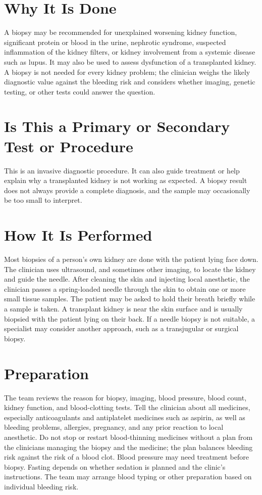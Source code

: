 \section*{Why It Is Done}
A biopsy may be recommended for unexplained worsening kidney function, significant protein or blood in the urine, nephrotic syndrome, suspected inflammation of the kidney filters, or kidney involvement from a systemic disease such as lupus. It may also be used to assess dysfunction of a transplanted kidney. A biopsy is not needed for every kidney problem; the clinician weighs the likely diagnostic value against the bleeding risk and considers whether imaging, genetic testing, or other tests could answer the question.

\section*{Is This a Primary or Secondary Test or Procedure}
This is an invasive diagnostic procedure. It can also guide treatment or help explain why a transplanted kidney is not working as expected. A biopsy result does not always provide a complete diagnosis, and the sample may occasionally be too small to interpret.

\section*{How It Is Performed}
Most biopsies of a person's own kidney are done with the patient lying face down. The clinician uses ultrasound, and sometimes other imaging, to locate the kidney and guide the needle. After cleaning the skin and injecting local anesthetic, the clinician passes a spring-loaded needle through the skin to obtain one or more small tissue samples. The patient may be asked to hold their breath briefly while a sample is taken. A transplant kidney is near the skin surface and is usually biopsied with the patient lying on their back. If a needle biopsy is not suitable, a specialist may consider another approach, such as a transjugular or surgical biopsy.

\section*{Preparation}
The team reviews the reason for biopsy, imaging, blood pressure, blood count, kidney function, and blood-clotting tests. Tell the clinician about all medicines, especially anticoagulants and antiplatelet medicines such as aspirin, as well as bleeding problems, allergies, pregnancy, and any prior reaction to local anesthetic. Do not stop or restart blood-thinning medicines without a plan from the clinicians managing the biopsy and the medicine; the plan balances bleeding risk against the risk of a blood clot. Blood pressure may need treatment before biopsy. Fasting depends on whether sedation is planned and the clinic's instructions. The team may arrange blood typing or other preparation based on individual bleeding risk.

